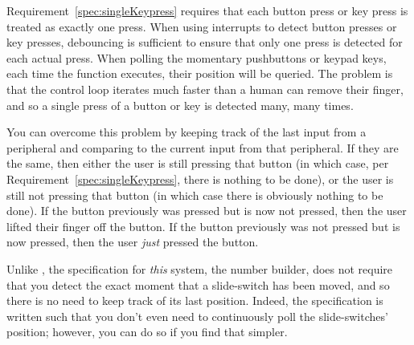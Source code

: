 Requirement~\ref{spec:singleKeypress} requires that each button press or key press is treated as exactly one press.
When using interrupts to detect button presses or key presses, debouncing is sufficient to ensure that only one press is detected for each actual press.
When polling the momentary pushbuttons or keypad keys, each time the  function executes, their position will be queried.
The problem is that the control loop iterates much faster than a human can remove their finger, and so a single press of a button or key is detected many, many times.

%

You can overcome this problem by keeping track of the last input from a peripheral and comparing to the current input from that peripheral.
If they are the same, then either the user is still pressing that button (in which case, per Requirement~\ref{spec:singleKeypress}, there is nothing to be done), or the user is still not pressing that button (in which case there is obviously nothing to be done).
If the button previously was pressed but is now not pressed, then the user lifted their finger off the button.
If the button previously was not pressed but is now pressed, then the user \textit{just} pressed the button.

Unlike , the specification for \textit{this} system, the number builder, does not require that you detect the exact moment that a slide-switch has been moved, and so there is no need to keep track of its last position.
Indeed, the specification is written such that you don't even need to continuously poll the slide-switches' position;
however, you can do so if you find that simpler.


